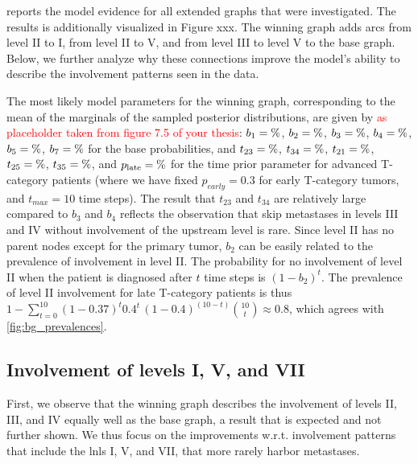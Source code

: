 \documentclass[twocolumn]{aastex631}
\newcommand{\ju}[1]{{\textcolor{red}{#1}}}
\begin{document}
 reports the model evidence for all extended graphs that were investigated. The results is additionally visualized in Figure xxx. The winning graph adds arcs from level II to I, from level II to V, and from level III to level V to the base graph. Below, we further analyze why these connections improve the model's ability to describe the involvement patterns seen in the data. 

The most likely model parameters for the winning graph, corresponding to the mean of the marginals of the sampled posterior distributions, are given by \ju{as placeholder taken from figure 7.5 of your thesis}: $b_1=\variable{output/wg_mean_b1.txt}\%$, $b_2=\variable{output/wg_mean_b2.txt}\%$, $b_3=\variable{output/wg_mean_b3.txt}\%$, $b_4=\variable{output/wg_mean_b4.txt}\%$, $b_5=\variable{output/wg_mean_b5.txt}\%$, $b_7=\variable{output/wg_mean_b7.txt}\%$ for the base probabilities, and $t_{23}=\variable{output/wg_mean_t23.txt}\%$, $t_{34}=\variable{output/wg_mean_t34.txt}\%$, $t_{21}=\variable{output/wg_mean_t21.txt}\%$, $t_{25}=\variable{output/wg_mean_t25.txt}\%$, $t_{35}=\variable{output/wg_mean_t35.txt}\%$, and $p_\text{late}=\variable{output/wg_mean_late_p.txt}\%$ for the time prior parameter for advanced T-category patients (where we have fixed $p_{early}=0.3$ for early T-category tumors, and $t_{max}=10$ time steps). The result that $t_{23}$ and $t_{34}$ are relatively large compared to $b_3$ and $b_4$ reflects the observation that skip metastases in levels III and IV without involvement of the upstream level is rare. Since level II has no parent nodes except for the primary tumor, $b_2$ can be easily related to the prevalence of involvement in level II. The probability for no involvement of level II when the patient is diagnosed after $t$ time steps is $\left(1-b_2\right)^t$. The prevalence of level II involvement for late T-category patients is thus $1-\sum_{t=0}^{10} \left(1-0.37\right)^t 0.4^t \, (1-0.4)^{(10-t)}\binom{10}{t}\approx 0.8$, which agrees with \cref{fig:bg_prevalences}.

\subsection{Involvement of levels I, V, and VII}

First, we observe that the winning graph describes the involvement of levels II, III, and IV equally well as the base graph, a result that is expected and not further shown. We thus focus on the improvements w.r.t. involvement patterns that include the \glspl{lnl} I, V, and VII, that more rarely harbor metastases.
\end{document}
